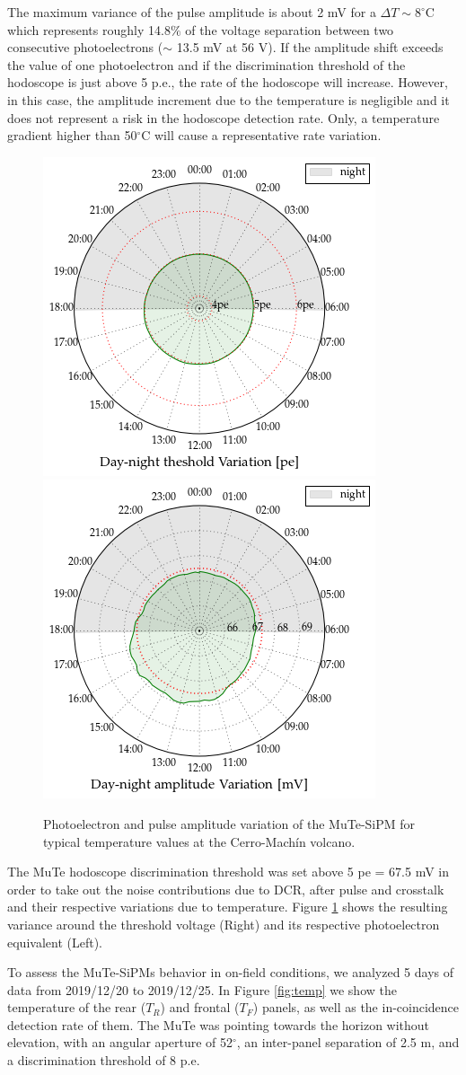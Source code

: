 \documentclass[a4paper,11pt]{article}
\begin{document}
The maximum variance of the pulse amplitude is about 2 mV for a $\Delta T \sim 8 ^{\circ}$C which represents roughly 14.8$\%$ of the voltage separation between two consecutive photoelectrons ($\sim$ 13.5 mV at 56 V). If the amplitude shift exceeds the value of one photoelectron and if the discrimination threshold of the hodoscope is just above 5 p.e., the rate of the hodoscope will increase. However, in this case, the amplitude increment due to the temperature is negligible and it does not represent a risk in the hodoscope detection rate. Only, a temperature gradient higher than 50$^{\circ}$C will cause a representative rate variation.

\begin{figure}[htbp]
\centering 
\includegraphics[width=.4\textwidth]{Figures/peT.png}
\includegraphics[width=.4\textwidth]{Figures/peakT.png}
\caption{\label{fig:thre} Photoelectron and pulse amplitude variation of the MuTe-SiPM for typical temperature values at the Cerro-Mach\'in volcano.}
\end{figure}

The MuTe hodoscope discrimination threshold was set above 5 pe = 67.5 mV in order to take out the noise contributions due to DCR, after pulse and crosstalk and their respective variations due to temperature. Figure \ref{fig:thre} shows the resulting variance around the threshold voltage (Right) and its respective photoelectron equivalent (Left). 

To assess the MuTe-SiPMs behavior in on-field conditions, we analyzed 5 days of data from 2019/12/20 to 2019/12/25. In Figure \ref{fig:temp} we show the temperature of the rear ($T_R$) and frontal ($T_F$) panels, as well as the in-coincidence detection rate of them. The MuTe was pointing towards the horizon without elevation, with an angular aperture of 52$^{\circ}$, an inter-panel separation of 2.5 m, and a discrimination threshold of 8 p.e.
\end{document}
